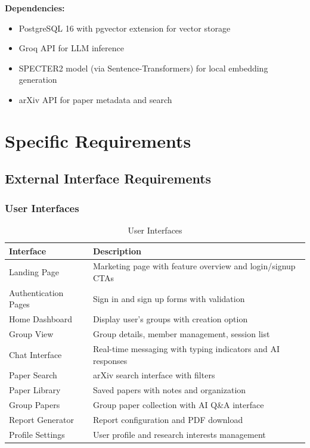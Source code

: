 \documentclass[11pt,a4paper]{article}
\begin{document}
\textbf{Dependencies:}
\begin{itemize}
    \item PostgreSQL 16 with pgvector extension for vector storage
    \item Groq API for LLM inference
    \item SPECTER2 model (via Sentence-Transformers) for local embedding generation
    \item arXiv API for paper metadata and search
\end{itemize}

\section{Specific Requirements}

\subsection{External Interface Requirements}

\subsubsection{User Interfaces}

\begin{table}[H]
\centering
\begin{tabular}{p{4cm}p{9cm}}
\toprule
\textbf{Interface} & \textbf{Description} \\
\midrule
Landing Page & Marketing page with feature overview and login/signup CTAs \\
Authentication Pages & Sign in and sign up forms with validation \\
Home Dashboard & Display user's groups with creation option \\
Group View & Group details, member management, session list \\
Chat Interface & Real-time messaging with typing indicators and AI responses \\
Paper Search & arXiv search interface with filters \\
Paper Library & Saved papers with notes and organization \\
Group Papers & Group paper collection with AI Q\&A interface \\
Report Generator & Report configuration and PDF download \\
Profile Settings & User profile and research interests management \\
\bottomrule
\end{tabular}
\caption{User Interfaces}
\end{table}
\end{document}
